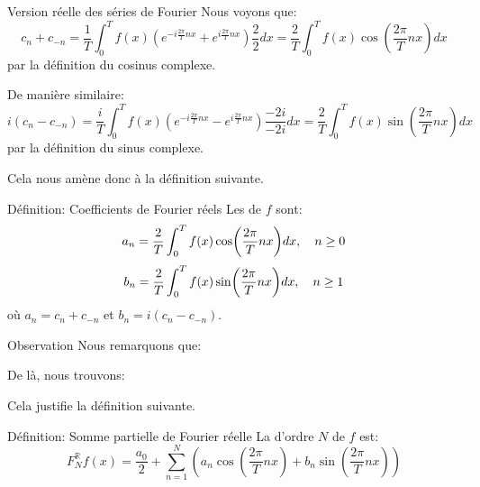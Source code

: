 \documentclass[a4paper]{article}
\begin{document}
\begin{parag}{Version réelle des séries de Fourier}
    Nous voyons que: 
    \[c_n + c_{-n} = \frac{1}{T} \int_{0}^{T} f\left(x\right) \left(e^{-i \frac{2\pi}{T} nx} + e^{i \frac{2\pi}{T} nx}\right) \frac{2}{2}dx = \frac{2}{T}\int_{0}^{T} f\left(x\right) \cos\left(\frac{2\pi}{T} nx\right) dx\]
    par la définition du cosinus complexe.

    De manière similaire: 
    \[i\left(c_n - c_{-n}\right) = \frac{i}{T} \int_{0}^{T} f\left(x\right) \left(e^{-i \frac{2\pi}{T}nx} - e^{i \frac{2\pi}{T} nx}\right) \frac{-2i}{-2i} dx = \frac{2}{T} \int_{0}^{T} f\left(x\right) \sin\left(\frac{2\pi}{T} nx\right)dx \]
    par la définition du sinus complexe.
    
    Cela nous amène donc à la définition suivante.
\end{parag}

\begin{parag}{Définition: Coefficients de Fourier réels}
    Les  de $f$ sont: 
    \[a_n = \frac{2}{T} \int_{0}^{T} f\left(x\right) \cos\left(\frac{2\pi}{T}nx\right)dx, \mathspace n \geq 0\]
    \[b_n = \frac{2}{T} \int_{0}^{T} f\left(x\right) \sin\left(\frac{2\pi}{T}nx\right)dx, \mathspace n \geq 1\]
    où $a_n = c_n + c_{-n}$ et $b_n = i\left(c_n - c_{-n}\right)$.
\end{parag}

\begin{parag}{Observation}
    Nous remarquons que:
    
    De là, nous trouvons:

    
    Cela justifie la définition suivante.
\end{parag}


\begin{parag}{Définition: Somme partielle de Fourier réelle}
    La  d'ordre $N$ de $f$ est: 
    \[F_N^{\mathbb{R}} f\left(x\right) = \frac{a_0}{2} + \sum_{n=1}^{N} \left(a_n \cos\left(\frac{2\pi}{T} nx\right) + b_n \sin\left(\frac{2\pi}{T} nx\right)\right) \]
\end{parag}
\end{document}
